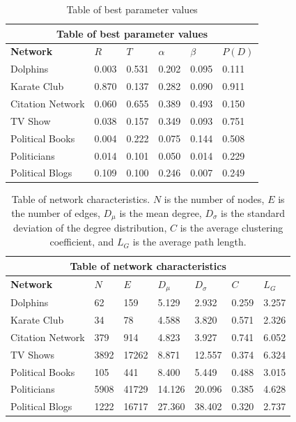 \documentclass{article}
\begin{document}
\begin{table}[H]
\begin{center}
    
\begin{tabular}{ |p{3cm}||p{2cm}|p{2cm}|p{2cm}|p{2cm}|p{2cm}|}
    \hline
    \multicolumn{6}{|c|}{Table of best parameter values} \\
    \hline
    \bf{Network} & $R$ & $T$ & $\alpha$ & $\beta$ & $P(D)$\\
    \hline
    Dolphins   & 0.003    &0.531&   0.202&   0.095&   0.111\\
    Karate Club&   0.870  & 0.137   &0.282&   0.090&   0.911\\
    Citation Network   &0.060 & 0.655&  0.389&   0.493&   0.150\\
    TV Show & 0.038 & 0.157 & 0.349 & 0.093 & 0.751 \\
    Political Books &0.004 & 0.222&  0.075&   0.144&   0.508\\
    Politicians&   0.014  & 0.101 &0.050&   0.014&   0.229\\
    Political Blogs & 0.109  & 0.100   &0.246&   0.007&   0.249\\
    \hline
\end{tabular}
\end{center}
\caption{Table of best parameter values}
\end{table}

\begin{table}[H]
    \begin{center}
        
    \begin{tabular}{ |p{3cm}||p{1.5cm}|p{1.5cm}|p{1.5cm}|p{1.5cm}|p{1.5cm}|p{1.5cm}|}
        \hline
        \multicolumn{7}{|c|}{Table of network characteristics} \\
        \hline
        \bf{Network} & $N$ & $E$ & $D_{\mu}$ & $D_{\sigma}$ & $C$ & $L_G$\\
        \hline
        Dolphins   & 62    &159&   5.129&   2.932 &   0.259 & 3.257\\
        Karate Club &34	&78	&4.588&	3.820&	0.571&	2.326\\
        Citation Network & 379 &	914	& 4.823	& 3.927 & 0.741 & 6.052 \\
        TV Shows & 3892 & 17262&8.871 & 12.557 & 0.374&6.324\\
        Political Books &105 &	441	& 8.400 &	5.449 &	0.488 &	3.015\\
        Politicians&  5908 &41729 & 14.126 & 20.096 &	0.385 & 4.628\\
        Political Blogs &	1222 & 16717 & 27.360 & 38.402 & 0.320 & 2.737\\
        \hline
    \end{tabular}
    \end{center}
    \caption{Table of network characteristics. $N$ is the number of nodes, $E$ is the number of edges, $D_{\mu}$ is the mean degree, $D_{\sigma}$ is the standard deviation of the degree distribution, $C$ is the average clustering coefficient, and $L_G$ is the average path length. }
    \end{table}
\end{document}

